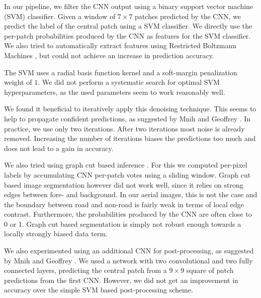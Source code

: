 \documentclass[10pt,conference,compsocconf]{IEEEtran}
\begin{document}
\par 
In our pipeline, we filter the CNN output using a binary support vector machine (SVM) classifier. Given a window of $ 7 \times 7 $ patches predicted by the CNN, we predict the label of the central patch using a SVM classifier. We directly use the per-patch probabilities produced by the CNN as features for the SVM classifier. We also tried to automatically extract features using Restricted Boltzmann Machines \cite{smolensky.1986}, but could not achieve an increase in prediction accuracy.
\par
The SVM uses a radial basis function kernel and a soft-margin penalization weight of $ 1 $. We did not perform a systematic search for optimal SVM hyperparameters, as the used parameters seem to work reasonably well.
\par 
We found it beneficial to iteratively apply this denoising technique. This seems to help to propagate confident predictions, as suggested by Mnih and Geoffrey \cite{Mnih.2010}. In practice, we use only two iterations. After two iterations most noise is already removed. Increasing the number of iterations biases the predictions too much and does not lead to a gain in accuracy.

\par
We also tried using graph cut based inference \cite{Boykov.2001}. For this we computed per-pixel labels by accumulating CNN per-patch votes using a sliding window. Graph cut based image segmentation however did not work well, since it relies on strong edges between fore- and background. In our aerial images, this is not the case and the boundary between road and non-road is fairly weak in terms of local edge contrast. Furthermore, the probabilities produced by the CNN are often close to 0 or 1. Graph cut based segmentation is simply not robust enough towards a locally strongly biased data term.

\par 
We also experimented using an additional CNN for post-processing, as suggested by Mnih and Geoffrey \cite{Mnih.2010}. We used a network with two convolutional and two fully connected layers, predicting the central patch from a $ 9 \times 9 $ square of patch predictions from the first CNN. However, we did not get an improvement in accuracy over the simple SVM based post-processing scheme.
\end{document}
